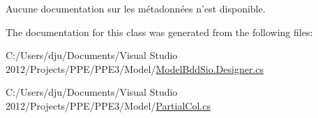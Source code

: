 Aucune documentation sur les métadonnées n'est disponible. 



The documentation for this class was generated from the following files\-:\begin{DoxyCompactItemize}
\item 
C\-:/\-Users/dju/\-Documents/\-Visual Studio 2012/\-Projects/\-P\-P\-E/\-P\-P\-E3/\-Model/\hyperlink{_model_bdd_sio_8_designer_8cs}{Model\-Bdd\-Sio.\-Designer.\-cs}\item 
C\-:/\-Users/dju/\-Documents/\-Visual Studio 2012/\-Projects/\-P\-P\-E/\-P\-P\-E3/\-Model/\hyperlink{_partial_col_8cs}{Partial\-Col.\-cs}\end{DoxyCompactItemize}
